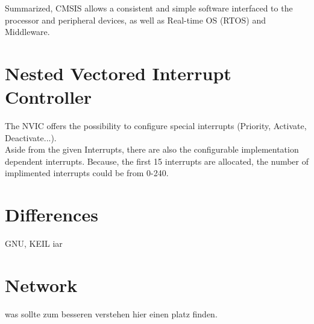 Summarized, CMSIS allows a consistent and simple software interfaced to the processor 
and peripheral devices, as well as Real-time OS (RTOS) and Middleware.

\section{Nested Vectored Interrupt Controller}
The NVIC offers the possibility to configure special interrupts 
(Priority, Activate, Deactivate...). \\
Aside from the given Interrupts, there are also the configurable implementation dependent interrupts.  
Because, the first 15 interrupts are allocated, the number of implimented interrupts could be from 0-240.

\section{Differences }
GNU, KEIL iar

\section{Network}
was sollte zum besseren verstehen hier einen platz finden.
